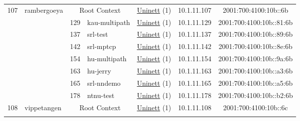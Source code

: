 \begin{small}
\begin{center}
\begin{longtable}{|c|c|c|c|c|c|c|c|}
 \multirow{8}{*}{\tiny{107}} & \multicolumn{1}{|l|}{\multirow{8}{*}{\tiny{rambergoeya}}} & \multicolumn{2}{|c|}{\tiny{Root Context}} & \multicolumn{2}{|c|}{\tiny{\href{https://www.uninett.no}{Uninett} (1)}} & \tiny{10.1.11.107} & \tiny{2001:700:4100:10b::6b} \\* \cline{3-3}\cline{4-4}\cline{5-5}\cline{6-6}\cline{7-7}\cline{8-8}
  &  & \tiny{129} & \multicolumn{1}{|l|}{\tiny{kau-multipath}} & \multicolumn{2}{|c|}{\tiny{\href{https://www.uninett.no}{Uninett} (1)}} & \tiny{10.1.11.129} & \tiny{2001:700:4100:10b::81:6b} \\* \cline{3-3}\cline{4-4}\cline{5-5}\cline{6-6}\cline{7-7}\cline{8-8}
  &  & \tiny{137} & \multicolumn{1}{|l|}{\tiny{srl-test}} & \multicolumn{2}{|c|}{\tiny{\href{https://www.uninett.no}{Uninett} (1)}} & \tiny{10.1.11.137} & \tiny{2001:700:4100:10b::89:6b} \\* \cline{3-3}\cline{4-4}\cline{5-5}\cline{6-6}\cline{7-7}\cline{8-8}
  &  & \tiny{142} & \multicolumn{1}{|l|}{\tiny{srl-mptcp}} & \multicolumn{2}{|c|}{\tiny{\href{https://www.uninett.no}{Uninett} (1)}} & \tiny{10.1.11.142} & \tiny{2001:700:4100:10b::8e:6b} \\* \cline{3-3}\cline{4-4}\cline{5-5}\cline{6-6}\cline{7-7}\cline{8-8}
  &  & \tiny{154} & \multicolumn{1}{|l|}{\tiny{hu-multipath}} & \multicolumn{2}{|c|}{\tiny{\href{https://www.uninett.no}{Uninett} (1)}} & \tiny{10.1.11.154} & \tiny{2001:700:4100:10b::9a:6b} \\* \cline{3-3}\cline{4-4}\cline{5-5}\cline{6-6}\cline{7-7}\cline{8-8}
  &  & \tiny{163} & \multicolumn{1}{|l|}{\tiny{hu-jerry}} & \multicolumn{2}{|c|}{\tiny{\href{https://www.uninett.no}{Uninett} (1)}} & \tiny{10.1.11.163} & \tiny{2001:700:4100:10b::a3:6b} \\* \cline{3-3}\cline{4-4}\cline{5-5}\cline{6-6}\cline{7-7}\cline{8-8}
  &  & \tiny{165} & \multicolumn{1}{|l|}{\tiny{srl-nndemo}} & \multicolumn{2}{|c|}{\tiny{\href{https://www.uninett.no}{Uninett} (1)}} & \tiny{10.1.11.165} & \tiny{2001:700:4100:10b::a5:6b} \\* \cline{3-3}\cline{4-4}\cline{5-5}\cline{6-6}\cline{7-7}\cline{8-8}
  &  & \tiny{178} & \multicolumn{1}{|l|}{\tiny{ntnu-test}} & \multicolumn{2}{|c|}{\tiny{\href{https://www.uninett.no}{Uninett} (1)}} & \tiny{10.1.11.178} & \tiny{2001:700:4100:10b::b2:6b} \\ \hline
 \multirow{7}{*}{\tiny{108}} & \multicolumn{1}{|l|}{\multirow{7}{*}{\tiny{vippetangen}}} & \multicolumn{2}{|c|}{\tiny{Root Context}} & \multicolumn{2}{|c|}{\tiny{\href{https://www.uninett.no}{Uninett} (1)}} & \tiny{10.1.11.108} & \tiny{2001:700:4100:10b::6c} \\* \cline{3-3}\cline{4-4}\cline{5-5}\cline{6-6}\cline{7-7}\cline{8-8}

\end{longtable}
\end{center}
\end{small}
